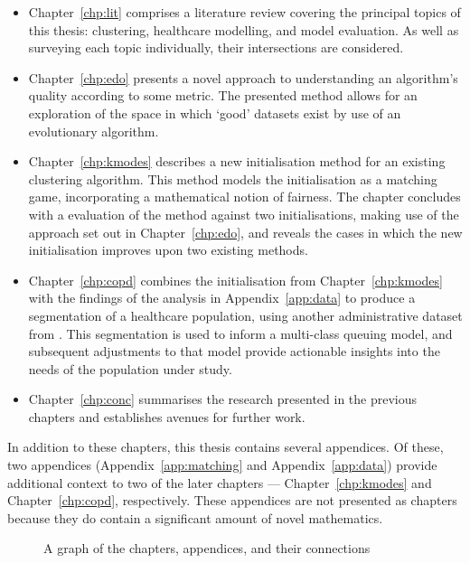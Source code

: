 \begin{itemize}
    \item Chapter~\ref{chp:lit} comprises a literature review covering the
        principal topics of this thesis: clustering, healthcare modelling, and
        model evaluation. As well as surveying each topic individually, their
        intersections are considered.
    \item Chapter~\ref{chp:edo} presents a novel approach to understanding an
        algorithm's quality according to some metric. The presented method
        allows for an exploration of the space in which `good' datasets exist
        by use of an evolutionary algorithm.
    \item Chapter~\ref{chp:kmodes} describes a new initialisation method for an
        existing clustering algorithm. This method models the initialisation as
        a matching game, incorporating a mathematical notion of fairness. The
        chapter concludes with a evaluation of the method against two
        initialisations, making use of the approach set out in
        Chapter~\ref{chp:edo}, and reveals the cases in which the new
        initialisation improves upon two existing methods.
    \item Chapter~\ref{chp:copd} combines the initialisation from
        Chapter~\ref{chp:kmodes} with the findings of the analysis in
        Appendix~\ref{app:data} to produce a segmentation of a healthcare
        population, using another administrative dataset from \ctmuhb. This
        segmentation is used to inform a multi-class queuing model, and
        subsequent adjustments to that model provide actionable insights into
        the needs of the population under study.
    \item Chapter~\ref{chp:conc} summarises the research presented in the
        previous chapters and establishes avenues for further work.
\end{itemize}

In addition to these chapters, this thesis contains several appendices. Of
these, two appendices (Appendix~\ref{app:matching} and Appendix~\ref{app:data})
provide additional context to two of the later chapters ---
Chapter~\ref{chp:kmodes} and Chapter~\ref{chp:copd}, respectively. These
appendices are not presented as chapters because they do contain a significant
amount of novel mathematics.

\begin{figure}[htbp]
    \centering%
    \resizebox{\imgwidth}{!}{%
        
    }
    \caption{%
        A graph of the chapters, appendices, and their connections%
    }\label{fig:structure}
\end{figure}

